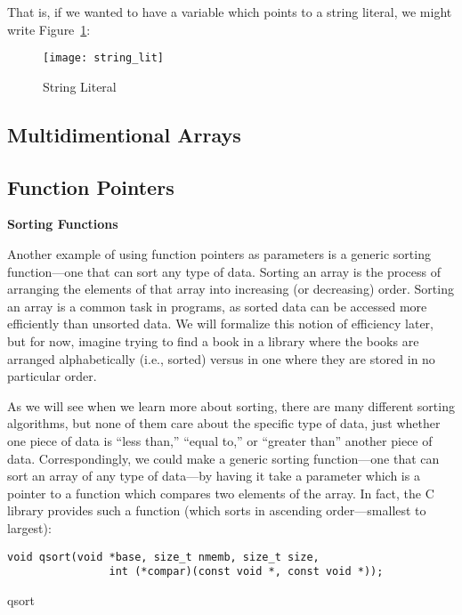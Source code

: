 \documentclass[11pt, a4paper]{article}
\begin{document}
That is, if we wanted to have a variable which points to a string literal, we might write Figure~\ref{fig:string_lit}: 


\begin{figure}[htpb]
  \centering
  \texttt{[image: string\_lit]}
  \caption{String Literal}
  \label{fig:string_lit}
\end{figure}




\subsection{Multidimentional Arrays}%
\label{sub:multidimentional_arrays}


\subsection{Function Pointers}%
\label{sub:function_pointers}


\textbf{Sorting Functions}


Another example of using function pointers as parameters is a generic sorting function—one that can sort any type of data. Sorting an array is the process of arranging the elements of that array into increasing (or decreasing) order. Sorting an array is a common task in programs, as sorted data can be accessed more efficiently than unsorted data. We will formalize this notion of efficiency later, but for now, imagine trying to find a book in a library where the books are arranged alphabetically (i.e., sorted) versus in one where they are stored in no particular order.

As we will see when we learn more about sorting, there are many different sorting algorithms, but none of them care about the specific type of data, just whether one piece of data is “less than,” “equal to,” or “greater than” another piece of data. Correspondingly, we could make a generic sorting function—one that can sort an array of any type of data—by having it take a parameter which is a pointer to a function which compares two elements of the array. In fact, the C library provides such a function (which sorts in ascending order—smallest to largest):



\begin{listing}
\begin{verbatim}
void qsort(void *base, size_t nmemb, size_t size, 
                int (*compar)(const void *, const void *));
\end{verbatim}
\caption{qsort}
\label{lst:qsort}
\end{listing}
\end{document}
